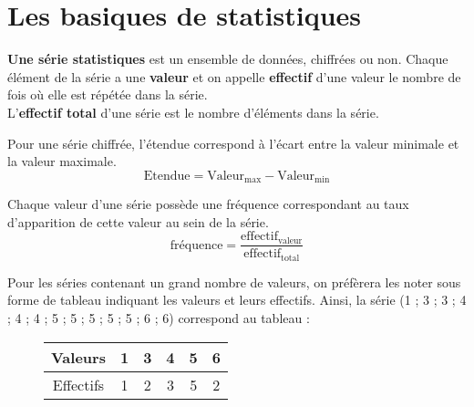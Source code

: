 \section{Les basiques de statistiques}

{\textbf{Une série statistiques} est un ensemble de données, chiffrées ou non.
Chaque élément de la série a une \textbf{valeur} et on appelle \textbf{effectif} d'une valeur le nombre de fois où elle est répétée dans la série.\\
L'\textbf{effectif total} d'une série est le nombre d'éléments dans la série.}


{Pour une série chiffrée, l'étendue correspond à l'écart entre la valeur minimale et la valeur maximale. $$\text{Etendue}=\text{Valeur}_{\text{max}}-\text{Valeur}_{\text{min}}$$}


{Chaque valeur d'une série possède une fréquence correspondant au taux d'apparition de cette valeur au sein de la série. $$\text{fréquence}=\dfrac{\text{effectif}_{\text{valeur}}}{\text{effectif}_{\text{total}}}$$}



Pour les séries contenant un grand nombre de valeurs, on préfèrera les noter sous forme de tableau indiquant les valeurs et leurs effectifs. Ainsi,  la série (1 ; 3 ; 3 ; 4 ; 4 ; 4 ; 5 ; 5 ; 5 ; 5 ; 5 ; 6 ; 6) correspond au tableau :
\begin{figure}[H]
    \center
    \begin{tabular}{c*{5}{|c}}
        Valeurs & 1 & 3 & 4 &5 & 6 \\ \hline
        Effectifs & 1 & 2 & 3 & 5 & 2
    \end{tabular}
\end{figure}

